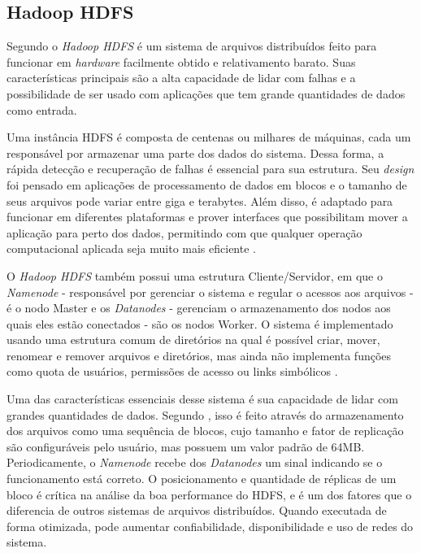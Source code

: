 \subsection{Hadoop HDFS}\label{ssec:hadoophdfs}

Segundo \textcite{HDFSDesign20} o \textit{Hadoop HDFS} é um sistema de arquivos distribuídos feito para funcionar em \textit{hardware} facilmente obtido e relativamento barato. Suas características principais são a alta capacidade de lidar com falhas e a possibilidade de ser usado com aplicações que tem grande quantidades de dados como entrada.

Uma instância HDFS é composta de centenas ou milhares de máquinas, cada um responsável por armazenar uma parte dos dados do sistema. Dessa forma, a rápida detecção e recuperação de falhas é essencial para sua estrutura. Seu \textit{design} foi pensado em aplicações de processamento de dados em blocos e o tamanho de seus arquivos pode variar entre giga e terabytes. Além disso, é adaptado para funcionar em diferentes plataformas e prover interfaces que possibilitam mover a aplicação para perto dos dados, permitindo com que qualquer operação computacional aplicada seja muito mais eficiente \cite{HDFSDesign20}.

O \textit{Hadoop HDFS} também possui uma estrutura Cliente/Servidor, em que o \textit{Namenode} - responsável por gerenciar o sistema e regular o acessos aos arquivos - é o nodo Master e os \textit{Datanodes} - gerenciam o armazenamento dos nodos aos quais eles estão conectados - são os nodos Worker. O sistema é implementado usando uma estrutura comum de diretórios na qual é possível criar, mover, renomear e remover arquivos e diretórios, mas ainda não implementa funções como quota de usuários, permissões de acesso ou links simbólicos \cite{HDFSDesign20}.

Uma das características essenciais desse sistema é sua capacidade de lidar com grandes quantidades de dados. Segundo \textcite{HDFSDesign20}, isso é feito através do armazenamento dos arquivos como uma sequência de blocos, cujo tamanho e fator de replicação são configuráveis pelo usuário, mas possuem um valor padrão de 64MB. Periodicamente, o \textit{Namenode} recebe dos \textit{Datanodes} um sinal indicando se o funcionamento está correto. O posicionamento e quantidade de réplicas de um bloco é crítica na análise da boa performance do HDFS, e é um dos fatores que o diferencia de outros sistemas de arquivos distribuídos. Quando executada de forma otimizada, pode aumentar confiabilidade, disponibilidade e uso de redes do sistema.



